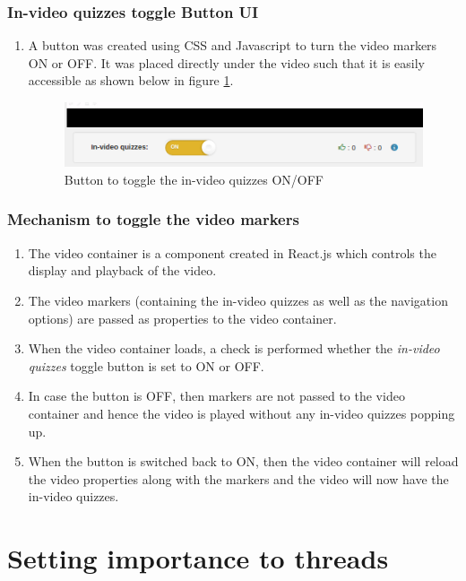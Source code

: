\subsubsection*{In-video quizzes toggle Button UI}
\begin{enumerate}
	\item A button was created using CSS and Javascript to turn the video markers ON or OFF. It was placed directly under the video such that it is easily accessible as shown below in figure \ref{fig:video-popup}.

	\begin{figure}[h]
	\centering
	\includegraphics[width=0.95\linewidth]{./media/video_popup}
	\caption{Button to toggle the in-video quizzes ON/OFF}
	\label{fig:video-popup}
	\end{figure}

\end{enumerate}

\subsubsection*{Mechanism to toggle the video markers}
\begin{enumerate}
	\item The video container is a component created in React.js  which controls the display and playback of the video.
	\item The video markers (containing the in-video quizzes as well as the navigation options) are passed as properties to the video container.
	\item When the video container loads, a check is performed whether the \textit{in-video quizzes} toggle button is set to ON or OFF.
	\item In case the button is OFF, then markers are not passed to the video container and hence the video is played without any in-video quizzes popping up.
	\item When the button is switched back to ON, then the video container will reload the video properties along with the markers and the video will now have the in-video quizzes.
\end{enumerate}

\newpage

\section{Setting importance to threads}

